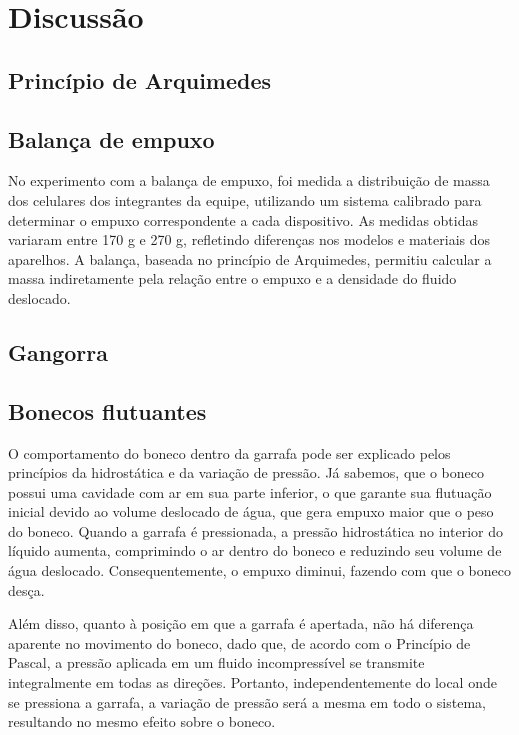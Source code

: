 \section{Discussão}
\subsection{Princípio de Arquimedes}

\subsection{Balança de empuxo}
No experimento com a balança de empuxo, foi medida a distribuição de massa dos
celulares dos integrantes da equipe, utilizando um sistema calibrado para
determinar o empuxo correspondente a cada dispositivo. As medidas obtidas
variaram entre 170 g e 270 g, refletindo diferenças nos modelos e materiais dos
aparelhos. A balança, baseada no princípio de Arquimedes, permitiu calcular a
massa indiretamente pela relação entre o empuxo e a densidade do fluido
deslocado.

\subsection{Gangorra}

\subsection{Bonecos flutuantes}
O comportamento do boneco dentro da garrafa pode ser explicado pelos princípios
da hidrostática e da variação de pressão. Já sabemos, que o boneco possui uma
cavidade com ar em sua parte inferior, o que garante sua flutuação inicial
devido ao volume deslocado de água, que gera empuxo maior que o peso do boneco.
Quando a garrafa é pressionada, a pressão hidrostática no interior do líquido
aumenta, comprimindo o ar dentro do boneco e reduzindo seu volume de água
deslocado. Consequentemente, o empuxo diminui, fazendo com que o boneco desça.

Além disso, quanto à posição em que a garrafa é apertada, não há diferença
aparente no movimento do boneco, dado que, de acordo com o Princípio de Pascal,
a pressão aplicada em um fluido incompressível se transmite integralmente em
todas as direções. Portanto, independentemente do local onde se pressiona a
garrafa, a variação de pressão será a mesma em todo o sistema, resultando no
mesmo efeito sobre o boneco.
